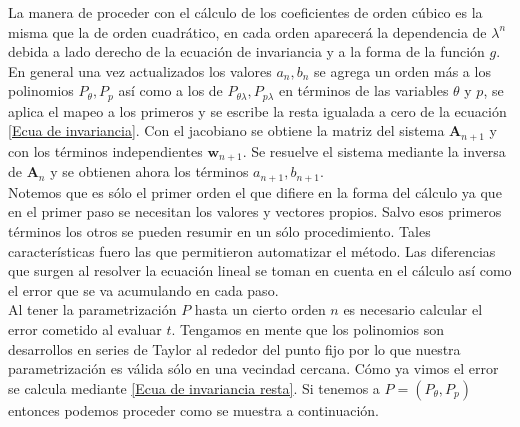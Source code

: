 La manera de proceder con el cálculo de los coeficientes de orden cúbico es la misma que la de orden cuadrático, en cada orden aparecerá la dependencia de $\lambda^{n}$ debida a lado derecho de la ecuación de invariancia y a la forma de la función $g$. En general una vez actualizados los valores $a_{n},b_{n}$ se agrega un orden más a los polinomios $P_{\theta},P_{p}$ así como a los de $P_{\theta\lambda},P_{p\lambda}$ en términos de las variables $\theta$ y $p$, se aplica el mapeo a los primeros y se escribe la resta igualada a cero de la ecuación \ref{Ecua de invariancia}. Con el jacobiano se obtiene la matriz del sistema $\mathbf{A}_{n+1}$ y con los términos independientes $\mathbf{w}_{n+1}$. Se resuelve el sistema mediante la inversa de $\mathbf{A}_{n}$ y se obtienen ahora los términos $a_{n+1},b_{n+1}$.\\

Notemos que es sólo el primer orden el que difiere en la forma del cálculo ya que en el primer paso se necesitan los valores y vectores propios. Salvo esos primeros términos los otros se pueden resumir en un sólo procedimiento. Tales características fuero las que permitieron automatizar el método. Las diferencias que surgen al resolver la ecuación lineal se toman en cuenta en el cálculo así como el error que se va acumulando en cada paso. \\

Al tener la parametrización $P$ hasta un cierto orden $n$ es necesario calcular el error cometido al evaluar $t$. Tengamos en mente que los polinomios son desarrollos en series de Taylor al rededor del punto fijo por lo que nuestra parametrización es válida sólo en una vecindad cercana. Cómo ya vimos el error se calcula mediante \ref{Ecua de invariancia resta}. Si tenemos a $P=(P_{\theta},P_{p})$ entonces podemos proceder como se muestra a continuación.

